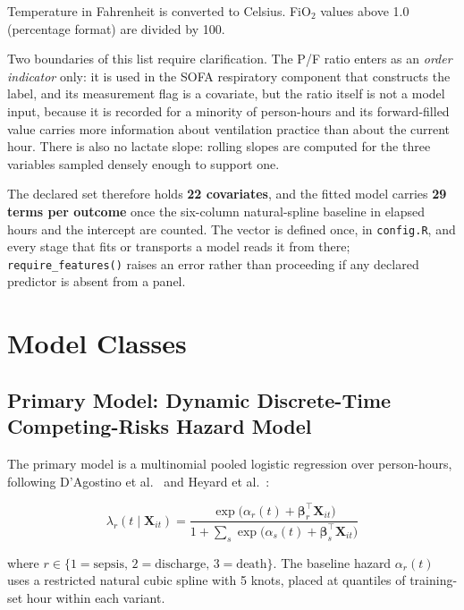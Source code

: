 Temperature in Fahrenheit is converted to Celsius. FiO$_2$ values above 1.0
(percentage format) are divided by 100.

Two boundaries of this list require clarification. The P/F ratio enters as an \emph{order indicator} only: it is used in
the SOFA respiratory component that constructs the label, and its measurement
flag is a covariate, but the ratio itself is not a model input, because it is
recorded for a minority of person-hours and its forward-filled value carries
more information about ventilation practice than about the current hour.
There is also no lactate slope: rolling slopes are computed for the three variables
sampled densely enough to support one.

The declared set therefore holds \textbf{22 covariates}, and the fitted model
carries \textbf{29 terms per outcome} once the six-column natural-spline
baseline in elapsed hours and the intercept are counted. The vector is defined
once, in \texttt{config.R}, and every stage that fits or transports a model
reads it from there; \texttt{require\_features()} raises an error rather than
proceeding if any declared predictor is absent from a panel.


\section{Model Classes}
\label{sec:models}

\subsection[Primary Model: Dynamic Discrete-Time Competing-Risks Hazard Model]%
{Primary Model: Dynamic Discrete-Time Compet\-ing-Risks Hazard Model}
\label{sec:primary_model_spec}

The primary model is a multinomial pooled logistic regression over person-hours,
following D'Agostino et al.\ \cite{dagostino1990pooled} and Heyard et al.\
\cite{heyard2019dynamic}:

\begin{equation}
    \lambda_r(t \mid \mathbf{X}_{it}) =
    \frac{\exp\!\bigl(\alpha_r(t) + \boldsymbol{\beta}_r^\top \mathbf{X}_{it}\bigr)}
    {1 + \sum_{s} \exp\!\bigl(\alpha_s(t) + \boldsymbol{\beta}_s^\top \mathbf{X}_{it}\bigr)}
    \label{eq:primary_model}
\end{equation}

where $r \in \{1=\text{sepsis},\, 2=\text{discharge},\, 3=\text{death}\}$.
The baseline hazard $\alpha_r(t)$ uses a restricted natural cubic spline with
5 knots, placed at quantiles of training-set hour within each variant.

